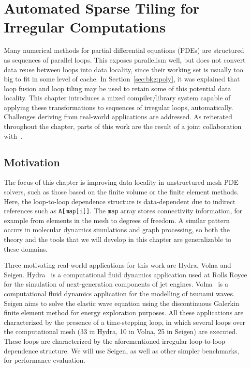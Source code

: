 \chapter{Automated Sparse Tiling for Irregular Computations}
\label{ch:sparsetiling}

Many numerical methods for partial differential equations (PDEs) are structured as sequences of parallel loops. This exposes parallelism well, but does not convert data reuse between loops into data locality, since their working set is usually too big to fit in some level of cache. In Section~\ref{sec:bkg:poly}, it was explained that loop fusion and loop tiling may be used to retain some of this potential data locality. This chapter introduces a mixed compiler/library system capable of applying these transformations to sequences of irregular loops, automatically. Challenges deriving from real-world applications are addressed. As reiterated throughout the chapter, parts of this work are the result of a joint collaboration with~\cite{st-paper}.

\section{Motivation}
\label{sec:tiling:motivation}

The focus of this chapter is improving data locality in unstructured mesh PDE solvers, such as those based on the finite volume or the finite element methods. Here, the loop-to-loop dependence structure is data-dependent due to indirect references such as \texttt{A[map[i]]}. The \texttt{map} array stores connectivity information, for example from elements in the mesh to degrees of freedom. A similar pattern occurs in molecular dynamics simulations and graph processing, so both the theory and the tools that we will develop in this chapter are generalizable to these domains. 

Three motivating real-world applications for this work are Hydra, Volna and Seigen. Hydra~\citep{hydra-op2} is a computational fluid dynamics application used at Rolls Royce for the simulation of next-generation components of jet engines. Volna~\citep{ST-volna} is a computational fluid dynamics application for the modelling of tsunami waves. Seigen aims to solve the elastic wave equation using the discontinuous Galerkin finite element method for energy exploration purposes. All these applications are characterized by the presence of a time-stepping loop, in which several loops over the computational mesh (33 in Hydra, 10 in Volna, 25 in Seigen) are executed. These loops are characterized by the aforementioned irregular loop-to-loop dependence structure. We will use Seigen, as well as other simpler benchmarks, for performance evaluation.

